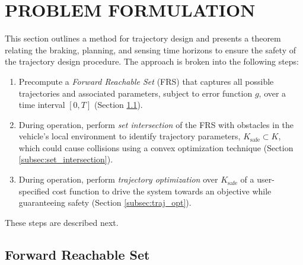 \section{PROBLEM FORMULATION}
\label{sec:problem_formulation}

This section outlines a method for trajectory design and presents a theorem relating the braking, planning, and sensing time horizons to ensure the safety of the trajectory design procedure.
The approach is broken into the following steps:
\begin{enumerate}
\item Precompute a \emph{Forward Reachable Set} (FRS) that captures all possible trajectories and associated parameters, subject to error function $g$, over a time interval $[0,T]$ (Section \ref{subsec:FRS}).
\item During operation, perform \emph{set intersection} of the FRS with obstacles in the vehicle's local environment to identify trajectory parameters, $K_{\text{safe}} \subset K$, which could cause collisions using a convex optimization technique (Section \ref{subsec:set_intersection}).
\item During operation, perform \emph{trajectory optimization} over $K_{\text{safe}}$ of a user-specified cost function to drive the system towards an objective while guaranteeing safety (Section \ref{subsec:traj_opt}).
\end{enumerate}
These steps are described next.

\subsection{Forward Reachable Set}
\label{subsec:FRS}

